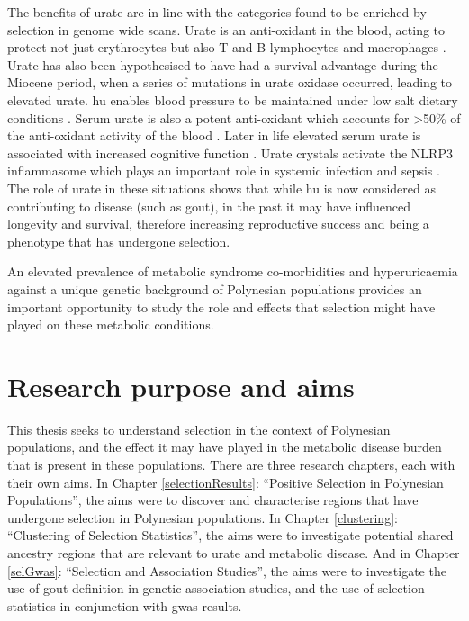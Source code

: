 \documentclass[]{report}
\begin{document}
The benefits of urate are in line with the categories found to be
enriched by selection in genome wide scans. Urate is an anti-oxidant in
the blood, acting to protect not just erythrocytes but also T and B
lymphocytes and macrophages \citep{Ames1981}. Urate has also been
hypothesised to have had a survival advantage during the Miocene period,
when a series of mutations in urate oxidase occurred, leading to
elevated urate. \Gls{hu} enables blood pressure to be maintained under
low salt dietary conditions \citep{Watanabe2002}. Serum urate is also a
potent anti-oxidant which accounts for \textgreater{}50\% of the
anti-oxidant activity of the blood \citep{Glantzounis2005, Parmar2009}.
Later in life elevated serum urate is associated with increased
cognitive function \citep{Euser2009}. Urate crystals activate the NLRP3
inflammasome which plays an important role in systemic infection and
sepsis \citep{Opitz2009}. The role of urate in these situations shows
that while \gls{hu} is now considered as contributing to disease (such
as gout), in the past it may have influenced longevity and survival,
therefore increasing reproductive success and being a phenotype that has
undergone selection.

An elevated prevalence of metabolic syndrome co-morbidities and
hyperuricaemia against a unique genetic background of Polynesian
populations provides an important opportunity to study the role and
effects that selection might have played on these metabolic conditions.

\section{Research purpose and aims}\label{research-purpose-and-aims}

This thesis seeks to understand selection in the context of Polynesian
populations, and the effect it may have played in the metabolic disease
burden that is present in these populations. There are three research
chapters, each with their own aims. In Chapter \ref{selectionResults}:
``Positive Selection in Polynesian Populations'', the aims were to
discover and characterise regions that have undergone selection in
Polynesian populations. In Chapter \ref{clustering}: ``Clustering of
Selection Statistics'', the aims were to investigate potential shared
ancestry regions that are relevant to urate and metabolic disease. And
in Chapter \ref{selGwas}: ``Selection and Association Studies'', the
aims were to investigate the use of gout definition in genetic
association studies, and the use of selection statistics in conjunction
with \gls{gwas} results.
\end{document}
